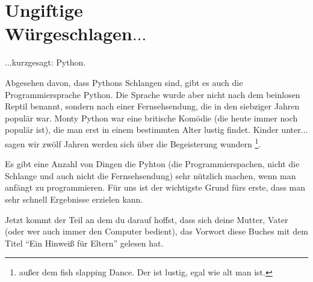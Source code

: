 \section{Ungiftige\\Würgeschlagen$\ldots$}

$\ldots$kurzgesagt: Python.

Abgesehen davon, dass Pythons Schlangen sind, gibt es auch die Programmiersprache Python. Die Sprache wurde aber nicht nach dem beinlosen Reptil benannt, sondern nach einer Fernsehsendung, die in den siebziger Jahren populär war. Monty Python war eine britische Komödie (die heute immer noch populär ist), die man erst in einem bestimmten Alter lustig findet. Kinder unter$\ldots$ sagen wir zwölf Jahren werden sich über die Begeisterung wundern \footnote{außer dem fish slapping Dance. Der ist lustig, egal wie alt man ist.}.

Es gibt eine Anzahl von Dingen die Pyhton (die Programmierspachen, nicht die Schlange und auch nicht die Fernsehsendung) sehr nützlich machen, wenn man anfängt zu programmieren. Für uns ist der wichtigste Grund fürs erste, dass man sehr schnell Ergebnisse erzielen kann.

Jetzt kommt der Teil an dem du darauf hoffst, dass sich deine Mutter, Vater (oder wer auch immer den Computer bedient), das Vorwort diese Buches mit dem Titel ``Ein Hinweiß für Eltern'' gelesen hat.

